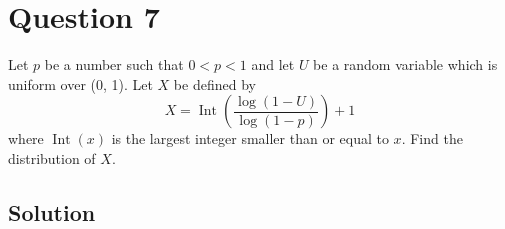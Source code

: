 \section*{Question 7}

Let \(p\) be a number such that \(0<p<1\) and let \(U\) be a random variable which is uniform over (0, 1).
Let \(X\) be defined by
\begin{equation*}
    X = \operatorname{Int} \left( \frac{\log (1-U)}{\log (1-p)} \right) + 1
\end{equation*}
where \(\operatorname{Int}(x)\) is the largest integer smaller than or equal to \(x\).
Find the distribution of \(X\).

\subsection*{Solution}
